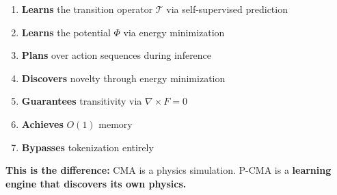 \documentclass[
  11pt,
  a4paper,
]{article}
\providecommand{\tightlist}{%
  \setlength{\itemsep}{0pt}\setlength{\parskip}{0pt}}
\begin{document}
\begin{enumerate}
\def\labelenumi{\arabic{enumi}.}
\tightlist
\item
  \textbf{Learns} the transition operator \(\mathcal{T}\) via
  self-supervised prediction
\item
  \textbf{Learns} the potential \(\Phi\) via energy minimization
\item
  \textbf{Plans} over action sequences during inference
\item
  \textbf{Discovers} novelty through energy minimization
\item
  \textbf{Guarantees} transitivity via \(\nabla \times F = 0\)
\item
  \textbf{Achieves} \(O(1)\) memory
\item
  \textbf{Bypasses} tokenization entirely
\end{enumerate}

\textbf{This is the difference:} CMA is a physics simulation. P-CMA is a
\textbf{learning engine that discovers its own physics.}
\end{document}
